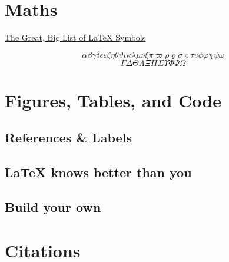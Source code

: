 \documentclass{article}
\begin{document}
\section{Maths}


\href{https://www.rpi.edu/dept/arc/training/latex/LaTeX_symbols.pdf}{The Great, Big List of \LaTeX{} Symbols} \cite{carlisle_great_2001}

\begin{equation}
    \alpha \beta \gamma \delta \epsilon \varepsilon \zeta \eta \theta \vartheta \iota \kappa \lambda \mu \nu \xi \pi \varpi \rho \varrho \sigma \varsigma \tau \upsilon \phi \varphi \chi \psi \omega
\end{equation}
\begin{equation}
    \Gamma \Delta \Theta \Lambda \Xi \Pi \Sigma \Upsilon \Phi \Psi \Omega
\end{equation}

\section{Figures, Tables, and Code}


\subsection{References \& Labels}


\subsection{\LaTeX{} knows better than you}


\subsection{Build your own}


\section{Citations}


\printbibliography
\end{document}
